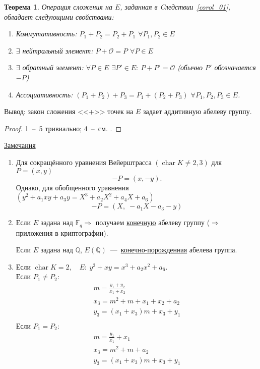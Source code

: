 \documentclass[12pt]{article}
\newcommand{\Q}{{{\mathbb Q}}}
\newcommand{\F}{{{\mathbb F}}}
\newtheorem{theorem}{Теорема}
\theoremstyle{definition}
\theoremstyle{definition}
\theoremstyle{definition}
\begin{document}
    \begin{theorem}
    	\label{theor_02}
    	Операция сложения на $E$, заданная в Cледствии~\ref{corol_01}, обладает следующими свойствами:
    	\begin{enumerate}
    		\item Коммутативность: ${P_1} + {P_2} = {P_2} + {P_1}$ $\forall {P_1},{P_2} \in E$
    		
    		\item $\exists $ нейтральный элемент: $P + \mathcal{O} = P$ $\forall P \in E$
    		
    		\item $\exists$ обратный элемент: $\forall P \in E$ $\exists P' \in E:\:P + P' = \mathcal{O}$ (обычно $P'$ обозначается $-P$)
    		
    		\item Ассоциативность: $\left( {{P_1} + {P_2}} \right) + {P_3} = {P_1} + \left( {{P_2} + {P_3}} \right)$ $\forall {P_1},{P_2},{P_3} \in E$.
    	\end{enumerate}
    \end{theorem}
    
    Вывод: закон сложения <<+>> точек на $E$ задает аддитивную абелеву группу.
    
    \begin{proof}
    1~--~5 тривиально; 4~--~см. \cite[\S2.4]{Washington2008}.
    \end{proof}
    
    \underline{Замечания} 
    \begin{enumerate}
    \item Для сокращённого уравнения Вейерштрасса $\left(\operatorname{char}K \ne 2,3 \right)$ для $P = \left( {x,y} \right)$ 
    \[
    - P = \left( {x, - y} \right).
    \] 
    Однако, для обобщенного уравнения $\left( {{y^2} + {a_1}xy + {a_3}y = {X^3} + {a_2}{X^2} + {a_4}X + {a_6}} \right)$ 
    \[ 
    - P = \left( {X,\; - {a_1}X - {a_3} - y} \right)
    \]
    
    \item Если $E$ задана над $\F_q \Rightarrow $ получаем \underline{конечную} абелеву группу ($ \Rightarrow $ приложения в криптографии).

    Если $E$ задана над $\Q$, $E\left( \Q \right)$~---~\underline{конечно-порожденная} абелева группа. 

    \item Если $\operatorname{char}K = 2, \quad E:\:{y^2} + xy = {x^3} + {a_2}{x^2} + {a_6}$. \\
    Если ${P_1} \ne {P_2}$:
    \begin{gather*}
    m = \frac{y_1 + y_2}{x_1 + x_2} \\ 
    x_3 = m^2 + m + x_1 + x_2 + a_2 \\ 
    y_3 = ( x_1 + x_3)m + x_3 + y_1 \\
    \end{gather*}
    Если ${P_1} = {P_2}$:
    \begin{gather*}
    m = \frac{y_1}{x_1} + x_1 \\
    x_3 = m^2 + m + a_2 \\
    y_3 =( {x_1 + x_3})m + x_3 + y_1
    \end{gather*}
    \end{enumerate}
\end{document}
